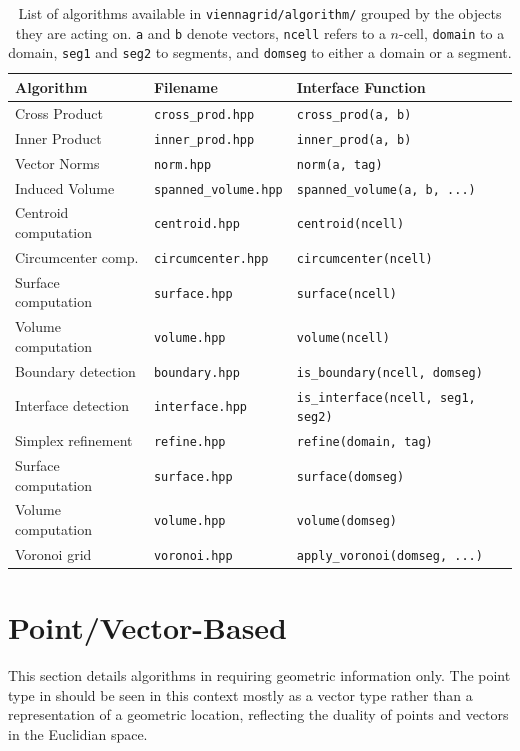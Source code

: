 \begin{table}
 \begin{tabular}{|l|l|l|}
  \hline
   Algorithm & Filename   & Interface Function\\
   \hline
   Cross Product & \texttt{cross\_prod.hpp} & \lstinline|cross_prod(a, b)| \\
   Inner Product & \texttt{inner\_prod.hpp} & \lstinline|inner_prod(a, b)|\\
   Vector Norms & \texttt{norm.hpp} & \lstinline|norm(a, tag)| \\
   Induced Volume & \texttt{spanned\_volume.hpp} & \lstinline|spanned_volume(a, b, ...)| \\
   \hline
   Centroid computation & \texttt{centroid.hpp} & \lstinline|centroid(ncell)| \\
   Circumcenter comp. & \texttt{circumcenter.hpp} & \lstinline|circumcenter(ncell)| \\
   Surface computation & \texttt{surface.hpp} & \lstinline|surface(ncell)| \\
   Volume computation & \texttt{volume.hpp} & \lstinline|volume(ncell)| \\
   \hline
   Boundary detection & \texttt{boundary.hpp} & \lstinline|is_boundary(ncell, domseg)|\\
   Interface detection & \texttt{interface.hpp} & \lstinline|is_interface(ncell, seg1, seg2)|\\
   Simplex refinement & \texttt{refine.hpp} & \lstinline|refine(domain, tag)| \\
   Surface computation & \texttt{surface.hpp} & \lstinline|surface(domseg)| \\
   Volume computation & \texttt{volume.hpp} & \lstinline|volume(domseg)| \\
   Voronoi grid & \texttt{voronoi.hpp} & \lstinline|apply_voronoi(domseg, ...)| \\
   \hline
 \end{tabular}
 \caption{List of algorithms available in \texttt{viennagrid/algorithm/} grouped by the objects they are acting on. 
    \lstinline|a| and \lstinline|b| denote vectors, \lstinline|ncell| refers to a $n$-cell,
    \lstinline|domain| to a domain, \lstinline|seg1| and \lstinline|seg2| to segments, and \lstinline|domseg| to either a domain or a segment.}
 \label{tab:algorithms}
\end{table}


\section{Point/Vector-Based}
This section details algorithms in {\ViennaGrid} requiring geometric information only.
The point type in {\ViennaGrid} should be seen in this context mostly as a vector type rather than a representation of a geometric location, reflecting the duality of points and vectors in the Euclidian space.

